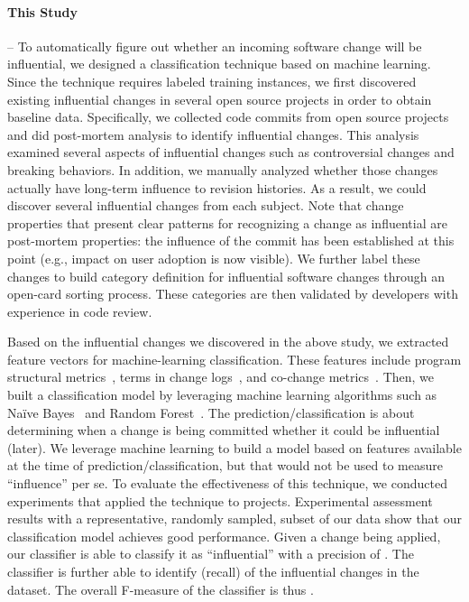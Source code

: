 \paragraph*{\bf This Study} -- To automatically figure out whether an incoming software change will be influential, we
designed a classification technique based on machine learning. Since
the technique requires labeled training instances, we first discovered existing
influential changes in several open source projects in order to obtain baseline
data. Specifically, we collected \numChanges code commits from \numSubjects open source projects and did
post-mortem analysis to identify influential changes. This analysis examined
several aspects of influential changes such as controversial changes and breaking
behaviors. In addition, we manually analyzed whether those changes actually have
long-term influence to revision histories.
As a result, we could discover several influential changes from each subject. Note that change properties that present clear patterns for recognizing a change as influential are post-mortem properties: the influence of the commit has been established at this point (e.g., impact on user adoption is now visible).
We further label these changes to build category definition for influential software changes
through an open-card sorting process. These categories are then validated by
developers with experience in code review.   



Based on the influential changes we discovered in the above study, we extracted
feature vectors for machine-learning classification. These features include program structural
metrics~\cite{kim_classifying_2008}, terms in change
logs~\cite{kim_classifying_2008}, and co-change metrics~\cite{Beyer05}.
Then, we built a classification model by leveraging machine learning algorithms such as
Na\"{i}ve Bayes~\cite{lewis:ecml:1998,mlbook} and Random
Forest~\cite{breiman_random_2001}. The prediction/classification is about determining when a change is being committed whether it could be influential (later). We leverage machine learning to build a model based on features available at the time of prediction/classification, but that would not be used to measure ``influence'' per se. 
To evaluate the effectiveness of this technique, we conducted experiments that
applied the technique to \numSubjects projects.
Experimental assessment results with a representative, randomly sampled, subset of our data show that 
our classification model achieves good performance. Given a change being applied, our classifier is able
to classify it as ``influential'' with a precision of 
\precisionwild. The classifier is further able to identify \recallwild (recall) of the influential changes 
in the dataset. The overall F-measure of the classifier is thus \fmeasurewild.

